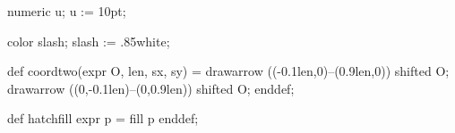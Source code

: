 %

\begin{mpostdef}
  numeric u;
  u := 10pt;

  color slash;
  slash := .85white;

  def coordtwo(expr O, len, sx, sy) =
    drawarrow ((-0.1len,0)--(0.9len,0)) shifted O;
    drawarrow ((0,-0.1len)--(0,0.9len)) shifted O;
  enddef;

  def hatchfill expr p =
    fill p
  enddef;
\end{mpostdef}
